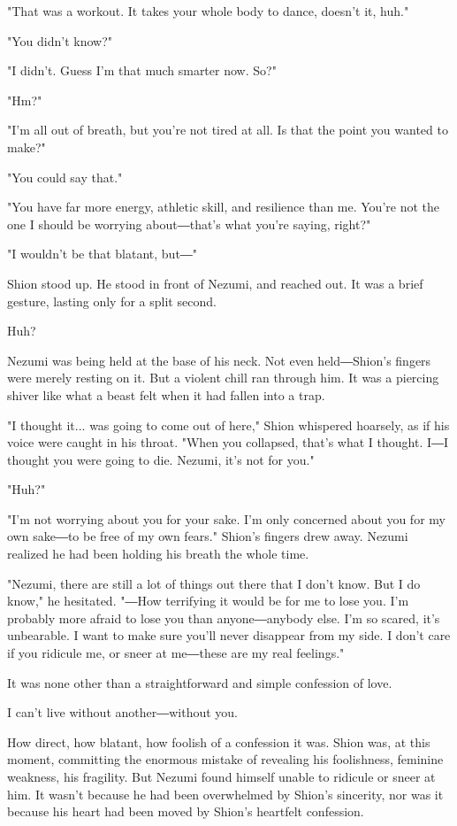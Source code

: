 "That was a workout. It takes your whole body to dance, doesn't it,
huh."

"You didn't know?"

"I didn't. Guess I'm that much smarter now. So?"

"Hm?"

"I'm all out of breath, but you're not tired at all. Is that the point
you wanted to make?"

"You could say that."

"You have far more energy, athletic skill, and resilience than me.
You're not the one I should be worrying about―that's what you're saying,
right?"

"I wouldn't be that blatant, but―"

Shion stood up. He stood in front of Nezumi, and reached out. It was a
brief gesture, lasting only for a split second.

Huh?

Nezumi was being held at the base of his neck. Not even held―Shion's
fingers were merely resting on it. But a violent chill ran through him.
It was a piercing shiver like what a beast felt when it had fallen into
a trap.

"I thought it... was going to come out of here," Shion whispered
hoarsely, as if his voice were caught in his throat. "When you
collapsed, that's what I thought. I―I thought you were going to die.
Nezumi, it's not for you."

"Huh?"

"I'm not worrying about you for your sake. I'm only concerned about you
for my own sake―to be free of my own fears." Shion's fingers drew away.
Nezumi realized he had been holding his breath the whole time.

"Nezumi, there are still a lot of things out there that I don't know.
But I do know," he hesitated. "―How terrifying it would be for me to
lose you. I'm probably more afraid to lose you than anyone―anybody else.
I'm so scared, it's unbearable. I want to make sure you'll never
disappear from my side. I don't care if you ridicule me, or sneer at
me―these are my real feelings."

It was none other than a straightforward and simple confession of love.

I can't live without another―without you.

How direct, how blatant, how foolish of a confession it was. Shion was,
at this moment, committing the enormous mistake of revealing his
foolishness, feminine weakness, his fragility. But Nezumi found himself
unable to ridicule or sneer at him. It wasn't because he had been
overwhelmed by Shion's sincerity, nor was it because his heart had been
moved by Shion's heartfelt confession.

